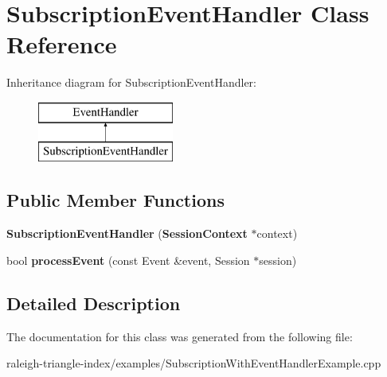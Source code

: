 \section{Subscription\+Event\+Handler Class Reference}
\label{class_subscription_event_handler}
Inheritance diagram for Subscription\+Event\+Handler\+:\begin{figure}[H]
\begin{center}
\leavevmode
\includegraphics[height=2.000000cm]{d5/da1/class_subscription_event_handler}
\end{center}
\end{figure}
\subsection*{Public Member Functions}
\begin{DoxyCompactItemize}
\item 
{\bfseries Subscription\+Event\+Handler} ({\bf Session\+Context} $\ast$context)\label{class_subscription_event_handler_ae74e5a97de0e63a093beb83ff9450539}

\item 
bool {\bfseries process\+Event} (const Event \&event, Session $\ast$session)\label{class_subscription_event_handler_a19742b1b87ab56db17bd60a523414899}

\end{DoxyCompactItemize}


\subsection{Detailed Description}


The documentation for this class was generated from the following file\+:\begin{DoxyCompactItemize}
\item 
raleigh-\/triangle-\/index/examples/Subscription\+With\+Event\+Handler\+Example.\+cpp\end{DoxyCompactItemize}
